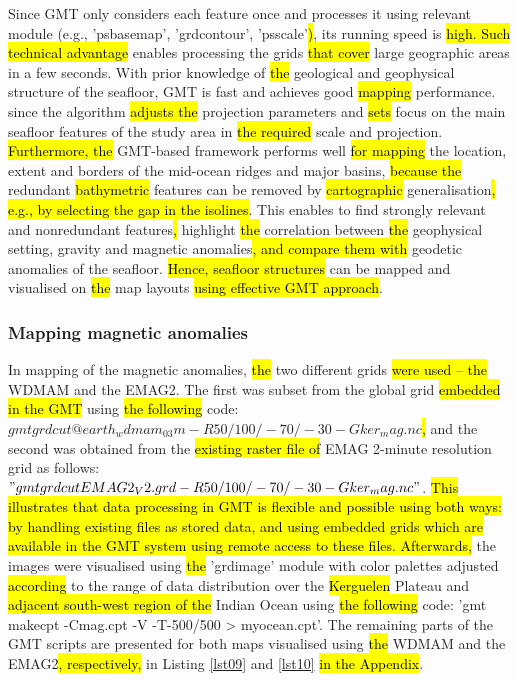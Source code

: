 \documentclass[geomatics,article,submit,pdftex,moreauthors]{Definitions/mdpi}
\begin{document}
Since GMT only considers each feature once and processes it using relevant module (e.g., 'psbasemap', 'grdcontour', 'psscale'\hl{)}, its running speed is \hl{high. Such technical advantage} enables processing the grids \hl{that cover} large geographic areas in a few seconds. With prior knowledge of \hl{the }geological and geophysical structure of the seafloor, GMT is fast and achieves good \hl{mapping }performance. since the\hl{ }algorithm\hl{ adjusts the} projection parameters and \hl{sets} focus on the main seafloor features of the study area in \hl{the required} scale and projection. \hl{Furthermore, the} GMT-based framework\hl{ }performs well \hl{for mapping} the location, extent and borders of the mid-ocean ridges and major basins, \hl{because the }redundant \hl{bathymetric} features can be removed by \hl{cartographic }generalisation\hl{, e.g., by selecting the gap in the isolines}. This enables to find strongly relevant and nonredundant features\hl{, }highlight \hl{the }correlation between \hl{the }geophysical setting, gravity and magnetic anomalies\hl{, and compare them with }geodetic anomalies\hl{ }of the seafloor. \hl{Hence, seafloor structures} can be mapped and visualised on \hl{the} map layouts \hl{using effective GMT approach}. 

\subsubsection{Mapping magnetic anomalies}

In mapping of the magnetic anomalies, \hl{the }two different grids \hl{were used -- the} WDMAM and the EMAG2. The first was subset from the global grid \hl{embedded in the GMT }using \hl{the following }code: $gmt grdcut @earth_wdmam_03m -R50/100/-70/-30 -Gker_mag.nc$\hl{, }and the second was obtained from the \hl{existing raster file of }EMAG 2-minute resolution grid as follows: $"gmt grdcut EMAG2_V2.grd -R50/100/-70/-30 -Gker_mag.nc"$. \hl{This illustrates that data processing in GMT is flexible and possible using both ways: by handling existing files as stored data, and using embedded grids which are available in the GMT system using remote access to these files. Afterwards, }the images were visualised using \hl{the }'grdimage' module with color palettes adjusted \hl{according} to the range of data distribution over the \hl{Kerguelen} Plateau and \hl{adjacent south-west region of the }Indian Ocean using \hl{the following }code: 'gmt makecpt -Cmag.cpt -V -T-500/500 > myocean.cpt'. The remaining parts of the GMT scripts are presented for both maps visualised using \hl{the }WDMAM and the EMAG2\hl{, respectively,} in Listing \ref{lst09} and \ref{lst10} \hl{in the Appendix}.
\end{document}

